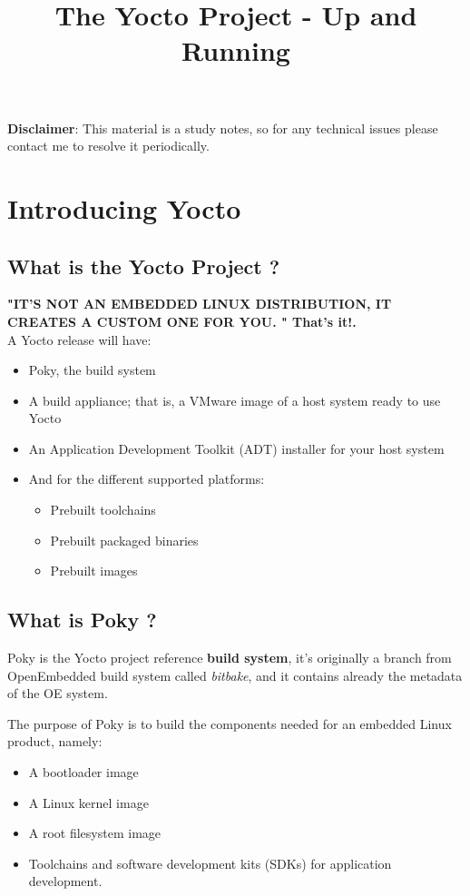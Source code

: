 \documentclass{article}
\title{\textbf{The Yocto Project - Up and Running}}
\author{}
\date{}
\begin{document}
\textbf{Disclaimer}: This material is a study notes, so for any technical issues please contact me to resolve it periodically.

\begin{minipage}{\textwidth}
    \maketitle
\end{minipage}
\tableofcontents{}
\section{Introducing Yocto}
\subsection{What is the Yocto Project ?}
\textbf{"IT'S NOT AN EMBEDDED LINUX DISTRIBUTION, IT CREATES A CUSTOM ONE FOR YOU. " That's it!.} \\

A Yocto release will have:
\begin{itemize}
    \item Poky, the build system
    \item A build appliance; that is, a VMware image of a host system ready to use Yocto
    \item An Application Development Toolkit (ADT) installer for your host system
    \item And for the different supported platforms:
\begin{itemize}
    \item Prebuilt toolchains
    \item Prebuilt packaged binaries
    \item Prebuilt images
\end{itemize}
\end{itemize}

\subsection{What is Poky ?}
Poky is the Yocto project reference \textbf{build system}, it's originally a branch from OpenEmbedded build system called \textit{bitbake}, and it contains already the metadata of the OE system.

The purpose of Poky is to build the components needed for an embedded Linux product, namely:
\begin{itemize}
    \item A bootloader image
    \item A Linux kernel image
    \item A root filesystem image
    \item Toolchains and software development kits (SDKs) for application development.
\end{itemize}
\end{document}
